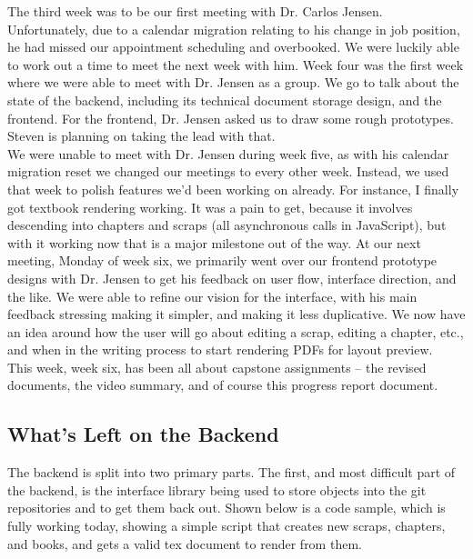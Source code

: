 \documentclass[onecolumn, draftclsnofoot,10pt, compsoc]{IEEEtran}
\begin{document}
\noindent The third week was to be our first meeting with Dr. Carlos Jensen.
Unfortunately, due to a calendar migration relating to his change in job
position, he had missed our appointment scheduling and overbooked. We were
luckily able to work out a time to meet the next week with him. Week four was the first 
week where we were able to meet with Dr. Jensen as a
group. We go to talk about the state of the backend, including its technical
document storage design, and the frontend. For the frontend, Dr. Jensen asked
us to draw some rough prototypes. Steven is planning on taking the lead with
that.\\

\noindent We were unable to meet with Dr. Jensen during week five, as with his calendar
migration reset we changed our meetings to every other week. Instead, we used
that week to polish features we'd been working on already. For instance, I
finally got textbook rendering working. It was a pain to get, because it
involves descending into chapters and scraps (all asynchronous calls in
JavaScript), but with it working now that is a major milestone out of the way. 
At our next meeting, Monday of week six, we primarily went over our frontend
prototype designs with Dr. Jensen to get his feedback on user flow, interface
direction, and the like. We were able to refine our vision for the interface,
with his main feedback stressing making it simpler, and making it less
duplicative. We now have an idea around how the user will go about editing a
scrap, editing  a chapter, etc., and when in the writing process to start
rendering PDFs for layout preview.\\

\noindent This week, week six, has been all about capstone assignments -- the revised
documents, the video summary, and of course this progress report document.

\newpage
\subsection{What's Left on the Backend}
The backend is split into two primary parts. The first, and most difficult part
of the backend, is the interface library being used to store objects into the
git repositories and to get them back out. Shown below is a code sample, which
is fully working today, showing a simple script that creates new scraps,
chapters, and books, and gets a valid tex document to render from them.
\end{document}
